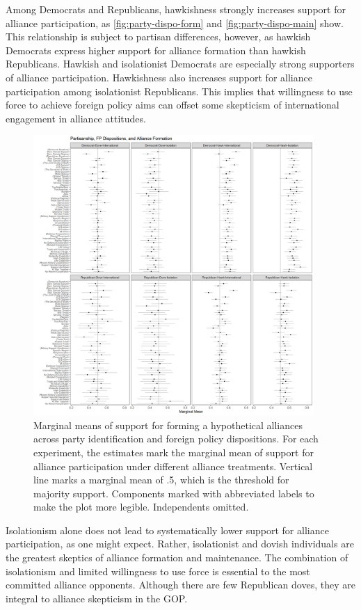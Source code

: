 \documentclass[12pt]{article}
\begin{document}
Among Democrats and Republicans, hawkishness strongly increases support for alliance participation, as \autoref{fig:party-dispo-form} and \autoref{fig:party-dispo-main} show. 
This relationship is subject to partisan differences, however, as hawkish Democrats express higher support for alliance formation than hawkish Republicans. 
Hawkish and isolationist Democrats are especially strong supporters of alliance participation. 
Hawkishness also increases support for alliance participation among isolationist Republicans. 
This implies that willingness to use force to achieve foreign policy aims can offset some skepticism of international engagement in alliance attitudes. 


\begin{figure}
	\centering
		\includegraphics[width=0.95\textwidth]{../figures/party-dispo-form.png}
	\caption{Marginal means of support for forming a hypothetical alliances across party identification and foreign policy dispositions. For each experiment, the estimates mark the marginal mean of support for alliance participation under different alliance treatments. Vertical line marks a marginal mean of .5, which is the threshold for majority support. Components marked with abbreviated labels to make the plot more legible. Independents omitted.}
	\label{fig:party-dispo-form}
\end{figure}


Isolationism alone does not lead to systematically lower support for alliance participation, as one might expect.
Rather, isolationist and dovish individuals are the greatest skeptics of alliance formation and maintenance. 
The combination of isolationism and limited willingness to use force is essential to the most committed alliance opponents. 
Although there are few Republican doves, they are integral to alliance skepticism in the GOP. 
\end{document}
